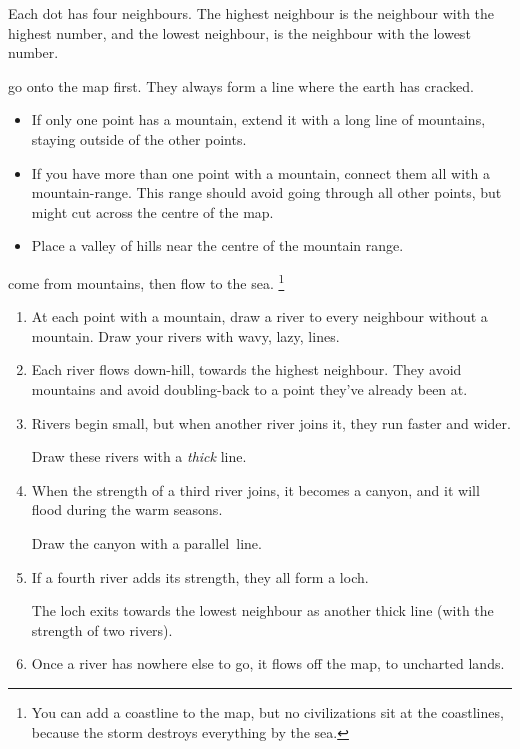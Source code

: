\begin{multicols}{2}
Each dot has four neighbours.
The highest neighbour is the neighbour with the highest number, and the lowest neighbour, is the neighbour with the lowest number.

go onto the map first.
They always form a line where the earth has cracked.

\begin{itemize}
  \item
  If only one point has a mountain, extend it with a long line of mountains, staying outside of the other points.
  \item
  If you have more than one point with a mountain, connect them all with a mountain-range.
  This range should avoid going through all other points, but might cut across the centre of the map.
  \item
  Place a valley of hills near the centre of the mountain range.
\end{itemize}

\label{mapRivers}
come from mountains, then flow to the sea.%
\footnote{You can add a coastline to the map, but no civilizations sit at the coastlines, because the \gls{storm} destroys everything by the sea.}

\begin{enumerate}
  \item
  At each point with a mountain, draw a river to every neighbour without a mountain.
  Draw your rivers with wavy, lazy, lines.
  \item
  Each river flows down-hill, towards the highest neighbour.
  They avoid mountains and avoid doubling-back to a point they've already been at.
  \item
  Rivers begin small, but when another river joins it, they run faster and wider.

  Draw these rivers with a \emph{thick} line.
  \item
  When the strength of a third river joins, it becomes a canyon, and it will flood during the warm seasons.

  Draw the canyon with a parallel~line.
  \item
  If a fourth river adds its strength, they all form a loch.
  
  The loch exits towards the lowest neighbour as another thick line (with the strength of two rivers).
  \item
  Once a river has nowhere else to go, it flows off the map, to uncharted lands.
\end{enumerate}


\end{multicols}
